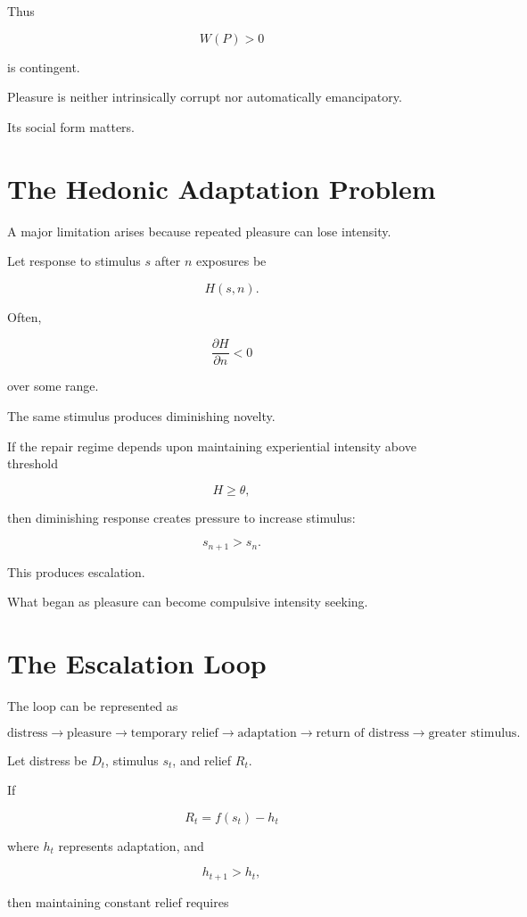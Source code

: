 \documentclass[11pt,oneside]{book}
\theoremstyle{definition}
\theoremstyle{remark}
\begin{document}
Thus

\[
W(P)>0
\]

is contingent.

Pleasure is neither intrinsically corrupt nor automatically emancipatory.

Its social form matters.

\section{The Hedonic Adaptation Problem}

A major limitation arises because repeated pleasure can lose intensity.

Let response to stimulus \(s\) after \(n\) exposures be

\[
H(s,n).
\]

Often,

\[
\frac{\partial H}{\partial n}<0
\]

over some range.

The same stimulus produces diminishing novelty.

If the repair regime depends upon maintaining experiential intensity above threshold

\[
H\geq\theta,
\]

then diminishing response creates pressure to increase stimulus:

\[
s_{n+1}>s_n.
\]

This produces escalation.

What began as pleasure can become compulsive intensity seeking.

\section{The Escalation Loop}

The loop can be represented as

\[
\text{distress}
\rightarrow
\text{pleasure}
\rightarrow
\text{temporary relief}
\rightarrow
\text{adaptation}
\rightarrow
\text{return of distress}
\rightarrow
\text{greater stimulus}.
\]

Let distress be \(D_t\), stimulus \(s_t\), and relief \(R_t\).

If

\[
R_t=f(s_t)-h_t
\]

where \(h_t\) represents adaptation, and

\[
h_{t+1}>h_t,
\]

then maintaining constant relief requires
\end{document}

